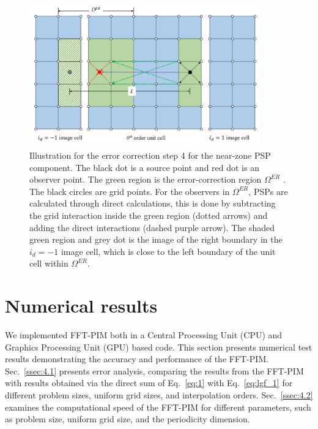 \documentclass{article}
\begin{document}
\begin{figure}[h] 
\includegraphics[width=10cm]{nufft.png}
\centering
\caption{Illustration for the error correction step 4 for the near-zone PSP component. The black dot is a source point and red dot is an observer point. The green region is the error-correction region $\Omega^{ER}$ . The black circles are grid points. For the observers in $\Omega^{ER}$, PSPs are calculated through direct calculations, this is done by subtracting the grid interaction inside the green region (dotted arrows) and adding the direct interactions (dashed purple arrow). The shaded green region and grey dot is the image of the right boundary in the $i_d=-1$ image cell, which is close to the left boundary of the unit cell within $\Omega^{ER} $.} \label{fig:nufft}
\end{figure}

\section{Numerical results} \label{sec:4}
We implemented FFT-PIM both in a Central Processing Unit (CPU) and Graphics Processing Unit (GPU) based code. This section presents numerical test results demonstrating the accuracy and performance of the FFT-PIM. Sec.~\ref{ssec:4.1} presents error analysis, comparing the results from the FFT-PIM with results obtained via the direct sum of Eq.~\eqref{eq:1} with Eq.~\eqref{eq:lgf_1} for different problem sizes, uniform grid sizes, and interpolation orders. Sec.~\ref{ssec:4.2} examines the computational speed of the FFT-PIM for different parameters, such as problem size, uniform grid size, and the periodicity dimension.
\end{document}
